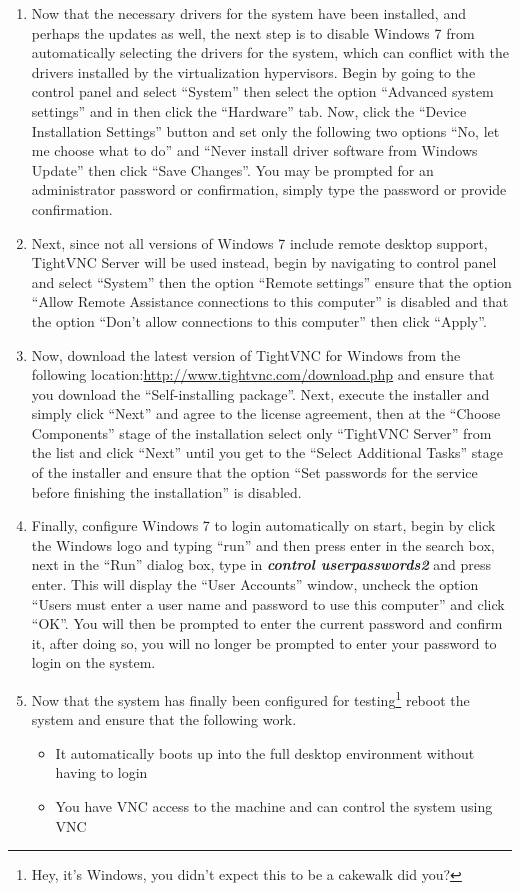 \begin{enumerate}
\item	Now that the necessary drivers for the system have been installed, and perhaps the updates as well, the next step is to disable
		Windows 7 from automatically selecting the drivers for the system, which can conflict with the drivers installed by the
		virtualization hypervisors. Begin by going to the control panel and select ``System'' then select the option ``Advanced
		system settings'' and in then click the ``Hardware'' tab. Now, click the ``Device Installation Settings'' button and
		set only the following two options ``No, let me choose what to do'' and ``Never install driver software from Windows
		Update'' then click ``Save Changes''. You may be prompted for an administrator password or confirmation, simply 
		type the password or provide confirmation.
		
		
\item	Next, since not all versions of Windows 7 include remote desktop support, TightVNC Server will be used instead, begin
		by navigating to control panel and select ``System'' then the option ``Remote settings'' ensure that the option
		``Allow Remote Assistance connections to this computer'' is disabled and that the option ``Don't allow connections
		to this computer'' then click ``Apply''.
		
\item	Now, download the latest version of TightVNC for Windows from the following location:\url{http://www.tightvnc.com/download.php}
		and ensure that you download the ``Self-installing package''. Next, execute the installer and simply click ``Next'' and agree
		to the license agreement, then at the ``Choose Components'' stage of the installation select only ``TightVNC Server'' from
		the list and click ``Next'' until you get to the ``Select Additional Tasks'' stage of the installer and ensure that the
		option ``Set passwords for the service before finishing the installation'' is disabled.
		
\item	Finally, configure Windows 7 to login automatically on start, begin by click the Windows logo and typing ``run'' and then press
		enter in the search box, next in the ``Run'' dialog box, type in \emph{\bf control userpasswords2} and press enter. This will
		display the ``User Accounts'' window, uncheck the option ``Users must enter a user name and password to use this computer''
		and click ``OK''. You will then be prompted to enter the current password and confirm it, after doing so, you will no longer 
		be prompted to enter your password to login on the system.

\item	Now that the system has finally been configured for testing\footnote{Hey, it's Windows, you didn't expect this to be a cakewalk
		did you?} reboot the system and ensure that the following work.
\begin{itemize}
\item	It automatically boots up into the full desktop environment without having to login
\item	You have VNC access to the machine and can control the system using VNC	
\end{itemize}
\end{enumerate}

